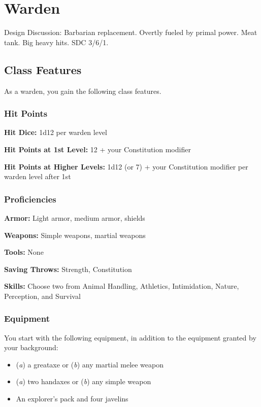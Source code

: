 \section{Warden}

Design Discussion: Barbarian replacement. Overtly fueled by primal power. Meat tank. Big heavy hits. SDC 3/6/1.

\subsection{Class Features}

As a warden, you gain the following class features.

\subsubsection{Hit Points}

\textbf{Hit Dice:} 1d12 per warden level

\textbf{Hit Points at 1st Level:} 12 + your Constitution modifier

\textbf{Hit Points at Higher Levels:} 1d12 (or 7) + your Constitution modifier per warden level after 1st

\subsubsection{Proficiencies}

\textbf{Armor:} Light armor, medium armor, shields

\textbf{Weapons:} Simple weapons, martial weapons

\textbf{Tools:} None

\textbf{Saving Throws:} Strength, Constitution

\textbf{Skills:} Choose two from Animal Handling, Athletics, Intimidation, Nature, Perception, and Survival

\subsubsection{Equipment}

You start with the following equipment, in addition to the equipment granted by your background:

\begin{itemize}
\item  (\textit{a}) a greataxe or (\textit{b}) any martial melee weapon
\item  (\textit{a}) two handaxes or (\textit{b}) any simple weapon
\item  An explorer’s pack and four javelins
\end{itemize}

